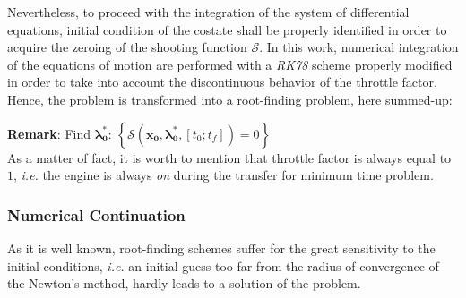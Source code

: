 Nevertheless, to proceed with the integration of the system of differential equations, initial condition of the costate shall be properly identified in order to acquire the zeroing of the shooting function $\mathscr{S}$. In this work, numerical integration of the equations of motion are performed with a \textit{RK78} scheme properly modified in order to take into account the discontinuous behavior of the throttle factor. %
Hence, the problem is transformed into a root-finding problem, here summed-up:

\textbf{Remark}: Find $\boldsymbol{\lambda^*_0}:\, \left\{ \mathscr{S}(\mathbf{x_0},\boldsymbol{\lambda^*_0}, [t_0; t_f]) = 0 \right\}$
\\
As a matter of fact, it is worth to mention that throttle factor is always equal to $1$, \textit{i.e.} the engine is always \emph{on} during the transfer for minimum time problem.

\subsubsection{Numerical Continuation}
\label{subsubsec:numericalcontinuation}
As it is well known, root-finding schemes suffer for the great sensitivity to the initial conditions, \textit{i.e.} an initial guess too far from the radius of convergence of the Newton's method, hardly leads to a solution of the problem. 

